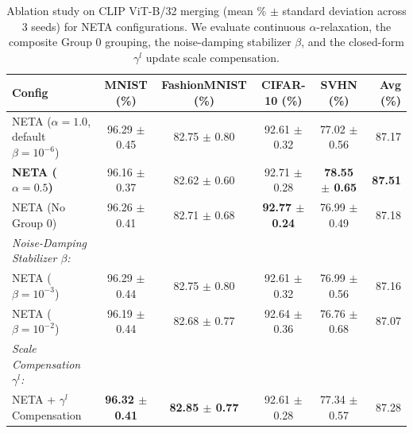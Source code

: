\begin{table}[ht]
\caption{Ablation study on CLIP ViT-B/32 merging (mean \% $\pm$ standard deviation across 3 seeds) for NETA configurations. We evaluate continuous $\alpha$-relaxation, the composite Group 0 grouping, the noise-damping stabilizer $\beta$, and the closed-form $\gamma^l$ update scale compensation.}
\label{tab:ablations}
\vskip 0.15in
\begin{center}
\begin{small}
\begin{sc}
\begin{tabular}{lccccr}
\toprule
Config & MNIST (\%) & FashionMNIST (\%) & CIFAR-10 (\%) & SVHN (\%) & Avg (\%) \\
\midrule
NETA ($\alpha=1.0$, default $\beta=10^{-6}$) & 96.29 $\pm$ 0.45 & 82.75 $\pm$ 0.80 & 92.61 $\pm$ 0.32 & 77.02 $\pm$ 0.56 & 87.17 \\
\textbf{NETA ($\alpha=0.5$)} & 96.16 $\pm$ 0.37 & 82.62 $\pm$ 0.60 & 92.71 $\pm$ 0.28 & \textbf{78.55 $\pm$ 0.65} & \textbf{87.51} \\
NETA (No Group 0) & 96.26 $\pm$ 0.41 & 82.71 $\pm$ 0.68 & \textbf{92.77 $\pm$ 0.24} & 76.99 $\pm$ 0.49 & 87.18 \\
\midrule
\textit{Noise-Damping Stabilizer $\beta$:} \\
NETA ($\beta = 10^{-3}$) & 96.29 $\pm$ 0.44 & 82.75 $\pm$ 0.80 & 92.61 $\pm$ 0.32 & 76.99 $\pm$ 0.56 & 87.16 \\
NETA ($\beta = 10^{-2}$) & 96.19 $\pm$ 0.44 & 82.68 $\pm$ 0.77 & 92.64 $\pm$ 0.36 & 76.76 $\pm$ 0.68 & 87.07 \\
\midrule
\textit{Scale Compensation $\gamma^l$:} \\
NETA + $\gamma^l$ Compensation & \textbf{96.32 $\pm$ 0.41} & \textbf{82.85 $\pm$ 0.77} & 92.61 $\pm$ 0.28 & 77.34 $\pm$ 0.57 & 87.28 \\
\bottomrule
\end{tabular}
\end{sc}
\end{small}
\end{center}
\vskip -0.1in
\end{table}

